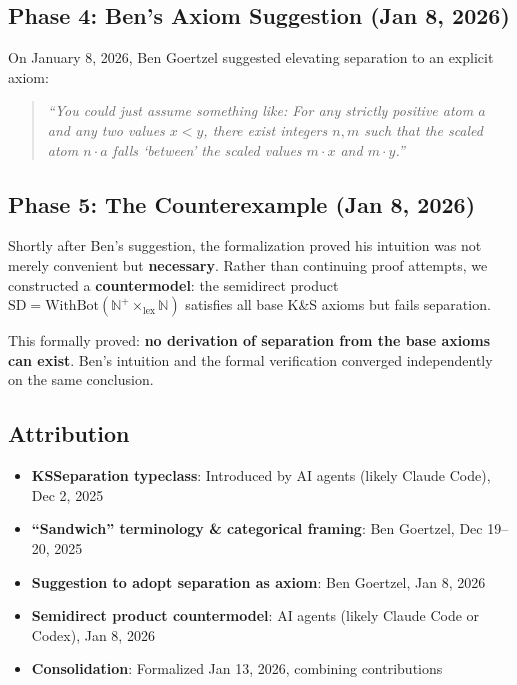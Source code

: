 \documentclass[11pt]{article}
\theoremstyle{definition}
\theoremstyle{remark}
\begin{document}
\subsection*{Phase 4: Ben's Axiom Suggestion (Jan 8, 2026)}

On January 8, 2026, Ben Goertzel suggested elevating separation to an explicit axiom:
\begin{quote}
\emph{``You could just assume something like: For any strictly positive atom $a$ and any two
values $x < y$, there exist integers $n, m$ such that the scaled atom $n \cdot a$ falls
`between' the scaled values $m \cdot x$ and $m \cdot y$.''}
\end{quote}

\subsection*{Phase 5: The Counterexample (Jan 8, 2026)}

Shortly after Ben's suggestion, the formalization proved his intuition was not merely
convenient but \textbf{necessary}. Rather than continuing proof attempts, we constructed
a \textbf{countermodel}: the semidirect product
$\text{SD} = \text{WithBot}(\mathbb{N}^+ \times_{\text{lex}} \mathbb{N})$
satisfies all base K\&S axioms but fails separation.

This formally proved: \textbf{no derivation of separation from the base axioms can exist}.
Ben's intuition and the formal verification converged independently on the same conclusion.

\subsection*{Attribution}

\begin{itemize}
\item \textbf{KSSeparation typeclass}: Introduced by AI agents (likely Claude Code), Dec 2, 2025
\item \textbf{``Sandwich'' terminology \& categorical framing}: Ben Goertzel, Dec 19--20, 2025
\item \textbf{Suggestion to adopt separation as axiom}: Ben Goertzel, Jan 8, 2026
\item \textbf{Semidirect product countermodel}: AI agents (likely Claude Code or Codex), Jan 8, 2026
\item \textbf{Consolidation}: Formalized Jan 13, 2026, combining contributions
\end{itemize}
\end{document}
